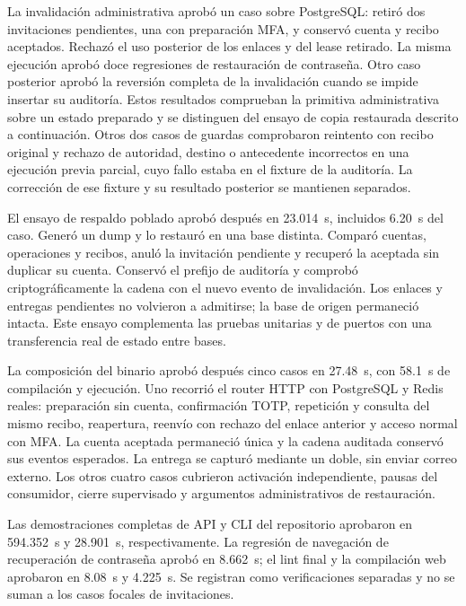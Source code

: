 La invalidaci\'on administrativa aprob\'o un caso sobre PostgreSQL: retir\'o dos
invitaciones pendientes, una con preparaci\'on MFA, y conserv\'o cuenta y recibo
aceptados. Rechaz\'o el uso posterior de los enlaces y del lease retirado. La
misma ejecuci\'on aprob\'o doce regresiones de restauraci\'on de contrase\~na.
Otro caso posterior aprob\'o la reversi\'on completa de la invalidaci\'on cuando
se impide insertar su auditor\'ia. Estos resultados comprueban la primitiva
administrativa sobre un estado preparado y se distinguen del ensayo de copia
restaurada descrito a continuaci\'on.
Otros dos casos de guardas comprobaron reintento con recibo original y rechazo
de autoridad, destino o antecedente incorrectos en una ejecuci\'on previa
parcial, cuyo fallo estaba en el fixture de la auditor\'ia. La correcci\'on de
ese fixture y su resultado posterior se mantienen separados.

El ensayo de respaldo poblado aprob\'o despu\'es en 23.014~s, incluidos 6.20~s
del caso. Gener\'o un dump y lo restaur\'o en una base distinta. Compar\'o cuentas,
operaciones y recibos, anul\'o la invitaci\'on pendiente y recuper\'o la aceptada
sin duplicar su cuenta. Conserv\'o el prefijo de auditor\'ia y comprob\'o
criptogr\'aficamente la cadena con el nuevo evento de invalidaci\'on. Los enlaces
y entregas pendientes no volvieron a admitirse; la base de origen permaneci\'o
intacta. Este ensayo complementa las pruebas unitarias y de puertos con una
transferencia real de estado entre bases.

La composici\'on del binario aprob\'o despu\'es cinco casos en 27.48~s, con
58.1~s de compilaci\'on y ejecuci\'on. Uno recorri\'o el router HTTP con
PostgreSQL y Redis reales: preparaci\'on sin cuenta, confirmaci\'on TOTP,
repetici\'on y consulta del mismo recibo, reapertura, reenv\'io con rechazo del
enlace anterior y acceso normal con MFA. La cuenta aceptada permaneci\'o \'unica
y la cadena auditada conserv\'o sus eventos esperados. La entrega se captur\'o
mediante un doble, sin enviar correo externo. Los otros cuatro casos cubrieron
activaci\'on independiente, pausas del consumidor, cierre supervisado y argumentos
administrativos de restauraci\'on.

Las demostraciones completas de API y CLI del repositorio aprobaron en
594.352~s y 28.901~s, respectivamente. La regresi\'on de navegaci\'on de
recuperaci\'on de contrase\~na aprob\'o en 8.662~s; el lint final y la
compilaci\'on web aprobaron en 8.08~s y 4.225~s. Se registran como verificaciones
separadas y no se suman a los casos focales de invitaciones.


